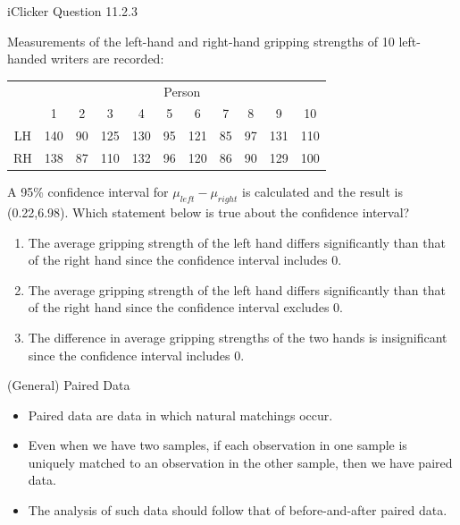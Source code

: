 \documentclass[14pt]{beamer}\usepackage[]{graphicx}\usepackage[]{color}
\begin{document}
\begin{frame}[fragile]{iClicker Question 11.2.3}

{\scriptsize{
Measurements of the left-hand and right-hand gripping strengths of 10  left-handed writers are recorded:
}}

\begin{table}[ht]
\centering
{\footnotesize{
\begin{tabular}{@{} ccccccccccc @{}} \hline
  & \multicolumn{10}{c}{Person} \\
  & 1 & 2 & 3 & 4 & 5 & 6 & 7 & 8 & 9 & 10 \\ \hline
LH & 140&90&125&130&95&121&85&97&131&110 \\
RH & 138&87&110&132&96&120&86&90&129&100 \\ \hline
\end{tabular}
}}
\end{table}

{\footnotesize{
A 95\% confidence interval for $\mu_{left} - \mu_{right}$ is calculated and the result is  (0.22,6.98). Which statement below is true about the confidence interval?

\vspace{-3mm}

\begin{enumerate}
\item The average gripping strength of the left hand differs  significantly than that of the right hand since the confidence  interval includes 0.
\item The average gripping strength of the left hand differs  significantly than that of the right hand since the confidence  interval excludes 0.
\item The difference in average gripping strengths of the two hands  is insignificant since the confidence interval includes 0.
\end{enumerate}
}}
\end{frame}

\begin{frame}[fragile]{(General) Paired Data}

\begin{itemize}
\item<1-> Paired data are data in which natural matchings occur.
\item<2-> Even when we have two samples, if each observation in one  sample is uniquely matched to an observation in the other sample,  then we have paired data.
\item<3-> The analysis of such data should follow that of before-and-after  paired data.
\end{itemize}
\end{frame}
\end{document}

